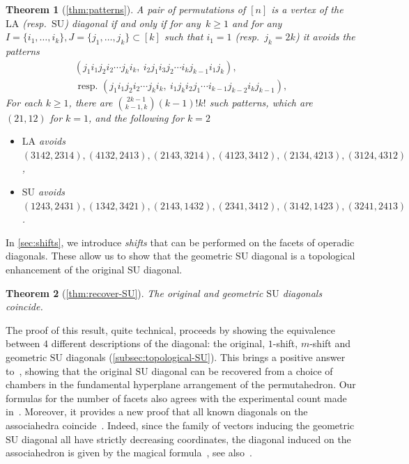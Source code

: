 \documentclass{amsart}
\newtheorem*{theorem*}{Theorem}
\theoremstyle{definition}
\newcommand{\resp}{resp.~} %
\newcommand{\SU}{\mathrm{SU}}
\newcommand{\LA}{\mathrm{LA}}
\begin{document}
\begin{theorem*}[\cref{thm:patterns}]
A pair of permutations of $[n]$ is a vertex of the $\LA$ (\resp $\SU$) diagonal if and only if for any~$k\geq 1$ and for any $I=\{i_1, \dots, i_k\},J=\{j_1, \dots, j_k\} \subset [k]$ such that $i_1=1$ (\resp $j_k=2k$) it avoids the patterns 
\begin{align}
	(j_1 i_1 j_2 i_2 \cdots j_k i_k,\ i_2 j_1 i_3 j_2 \cdots i_k j_{k-1} i_1 j_k), \tag{LA} \\
	\text{ \resp } (j_1 i_1 j_2 i_2 \cdots j_k i_k, \ i_1 j_k i_2 j_1 \cdots i_{k-1} j_{k-2}i_k j_{k-1}), \tag{SU}
\end{align}
For each $k \ge 1$, there are $\binom{2k-1}{k-1,k}(k-1)!k!$ such patterns, which are $(21,12)$ for $k=1$, and the following for $k=2$
\begin{itemize}
	\item $\LA$ avoids 
	$(3142,2314), (4132,2413),
	(2143,3214), (4123,3412),
	(2134,4213), (3124,4312)$,
	\item $\SU$ avoids 
	$(1243,2431),(1342,3421),
	(2143,1432),(2341,3412),
	(3142,1423),(3241,2413)$.
\end{itemize}
\end{theorem*}

In \cref{sec:shifts}, we introduce \emph{shifts} that can be performed on the facets of operadic diagonals.
These allow us to show that the geometric $\SU$ diagonal is a topological enhancement of the original $\SU$ diagonal. 

\begin{theorem*}[\cref{thm:recover-SU}]
The original and geometric $\SU$ diagonals coincide. 
\end{theorem*}

The proof of this result, quite technical, proceeds by showing the equivalence between $4$ different descriptions of the diagonal: the original, $1$-shift, $m$-shift and geometric $\SU$ diagonals (\cref{subsec:topological-SU}).
This brings a positive answer to~\cite[Rem.~2.19]{LaplanteAnfossi}, showing that the original $\SU$ diagonal can be recovered from a choice of chambers in the fundamental hyperplane arrangement of the permutahedron. 
Our formulas for the number of facets also agrees with the experimental count made in~\cite{VejdemoJohansson}.
Moreover, it provides a new proof that all known diagonals on the associahedra coincide~\cite{SaneblidzeUmble-comparingDiagonals}.
Indeed, since the family of vectors inducing the geometric $\SU$ diagonal all have strictly decreasing coordinates, the diagonal induced on the associahedron is given by the magical formula~\cite[Thm.~2]{MasudaThomasTonksVallette}, see also~\cite[Prop.~3.8]{LaplanteAnfossi}.
\end{document}
